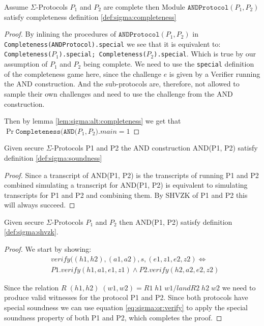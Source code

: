 \begin{lemma}
  Assume $\Sigma$-Protocols $P_{1}$ and $P_{2}$ are complete then
  Module $\texttt{ANDProtocol}(P_1, P_2)$ satisfy completeness definition \ref{def:sigma:completeness}
\end{lemma}
\begin{proof}
  By inlining the procedures of $\texttt{ANDProtocol}(P_{1}, P_{2})$ in
  \texttt{Completeness(ANDProtocol).special} we see that it is equivalent to:
  \texttt{Completeness($P_{1}$).special; Completeness($P_{2}$).special}. Which is true by our
  assumption of $P_{1}$ and $P_{2}$ being complete.
  We need to use the \texttt{special} definition of the completeness game here,
  since the challenge $e$ is given by a Verifier running the AND construction.
  And the sub-protocols are, therefore, not allowed to sample their own
  challenges and need to use the challenge from the AND construction.

  Then by lemma \ref{lem:sigma:alt:completeness} we get that
  $\Pr{\texttt{Completeness(AND($P_{1}, P_{2}$)}.main} = 1$
\end{proof}


\begin{lemma}
  Given secure $\Sigma$-Protocols P1 and P2
  the AND construction AND(P1, P2) satisfy definition \ref{def:sigma:soundness}
\end{lemma}
\begin{proof}
  Since a transcript of AND(P1, P2) is the transcripts of running P1 and P2
  combined simulating a transcript for AND(P1, P2) is equivalent to simulating
  transcripts for P1 and P2 and combining them. By SHVZK of P1 and P2 this will
  always succeed.
\end{proof}

\begin{lemma}
  Given secure $\Sigma$-Protocols $P_{1}$ and $P_{2}$ then AND(P1, P2) satisfy
  definition \ref{def:sigma:shvzk}.
\end{lemma}
\begin{proof}
  We start by showing:
  \begin{align}
    \label{eq:sigma:or:verify}
    &verify((h1, h2), (a1, a2), s, (e1, z1, e2, z2) \iff  \\
    &P1.verify(h1, a1, e1, z1) \land P2.verify(h2, a2, e2, z2)
  \end{align}

  Since the relation
  $R \; (h1, h2) \; (w1, w2) = R1 \; h1 \; w1 /land R2 \; h2 \; w2$ we need to
  produce valid witnesses for the protocol P1 and P2. Since both protocols have
  special soundness we can use equation \ref{eq:sigma:or:verify} to apply the
  special soundness property of both P1 and P2, which completes the proof.
\end{proof}

